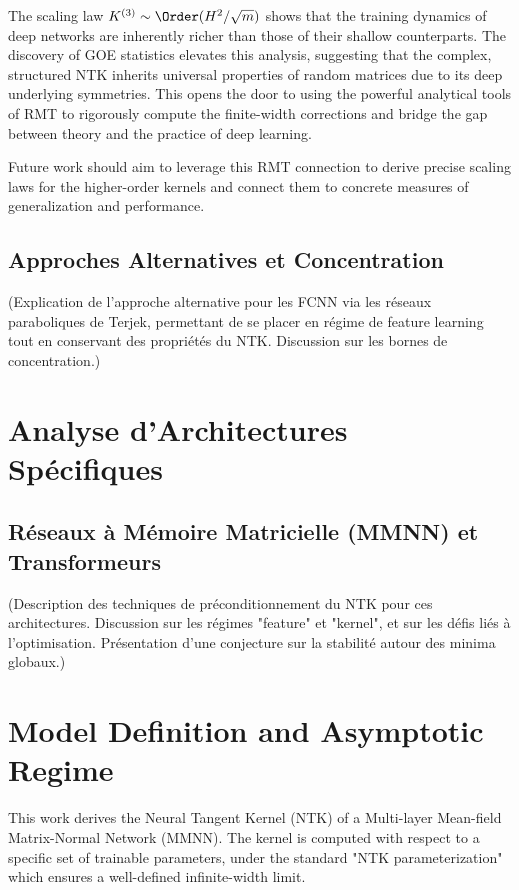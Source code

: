 \documentclass[a4paper]{article}
\begin{document}
The scaling law $K^{(3)} \sim \Order(H^2/\sqrt{m})$ shows that the training dynamics of deep networks are inherently richer than those of their shallow counterparts. The discovery of GOE statistics elevates this analysis, suggesting that the complex, structured NTK inherits universal properties of random matrices due to its deep underlying symmetries. This opens the door to using the powerful analytical tools of RMT to rigorously compute the finite-width corrections and bridge the gap between theory and the practice of deep learning.

Future work should aim to leverage this RMT connection to derive precise scaling laws for the higher-order kernels and connect them to concrete measures of generalization and performance.







\subsection{Approches Alternatives et Concentration}
(Explication de l'approche alternative pour les FCNN via les réseaux paraboliques de Terjek, permettant de se placer en régime de feature learning tout en conservant des propriétés du NTK. Discussion sur les bornes de concentration.)

\section{Analyse d'Architectures Spécifiques}




\subsection{Réseaux à Mémoire Matricielle (MMNN) et Transformeurs}
(Description des techniques de préconditionnement du NTK pour ces architectures. Discussion sur les régimes "feature" et "kernel", et sur les défis liés à l'optimisation. Présentation d'une conjecture sur la stabilité autour des minima globaux.)


\section{Model Definition and Asymptotic Regime}
This work derives the Neural Tangent Kernel (NTK) of a Multi-layer Mean-field Matrix-Normal Network (MMNN). The kernel is computed with respect to a specific set of trainable parameters, under the standard "NTK parameterization" which ensures a well-defined infinite-width limit.
\end{document}
